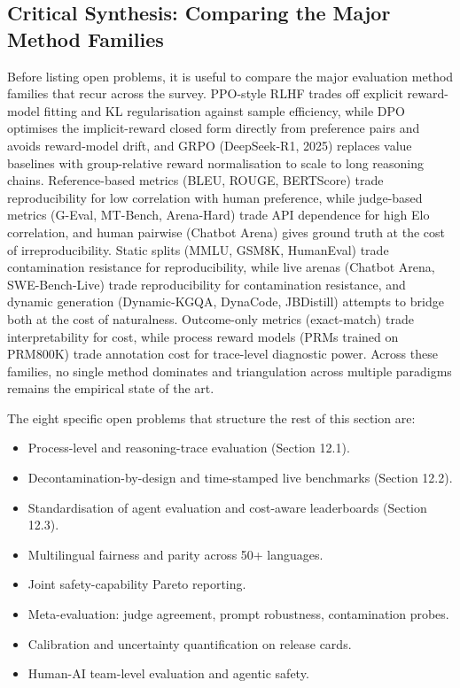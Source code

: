 \documentclass{article}
\begin{document}
\subsection{Critical Synthesis: Comparing the Major Method Families}\label{critical-synthesis-comparing-the-major-method-families}

Before listing open problems, it is useful to compare the major evaluation method families that recur across the survey. PPO-style RLHF \cite{ouyang20222022} trades off explicit reward-model fitting and KL regularisation against sample efficiency, while DPO \cite{rafailov2023directpreferenceop} optimises the implicit-reward closed form directly from preference pairs and avoids reward-model drift, and GRPO (DeepSeek-R1, 2025) replaces value baselines with group-relative reward normalisation to scale to long reasoning chains. Reference-based metrics (BLEU, ROUGE, BERTScore) trade reproducibility for low correlation with human preference, while judge-based metrics (G-Eval, MT-Bench, Arena-Hard) trade API dependence for high Elo correlation, and human pairwise (Chatbot Arena) gives ground truth at the cost of irreproducibility. Static splits (MMLU, GSM8K, HumanEval) trade contamination resistance for reproducibility, while live arenas (Chatbot Arena, SWE-Bench-Live) trade reproducibility for contamination resistance, and dynamic generation (Dynamic-KGQA, DynaCode, JBDistill) attempts to bridge both at the cost of naturalness. Outcome-only metrics (exact-match) trade interpretability for cost, while process reward models (PRMs trained on PRM800K) trade annotation cost for trace-level diagnostic power. Across these families, no single method dominates and triangulation across multiple paradigms remains the empirical state of the art.

The eight specific open problems that structure the rest of this section are:

\begin{itemize}

\item
  Process-level and reasoning-trace evaluation (Section 12.1).
\item
  Decontamination-by-design and time-stamped live benchmarks (Section 12.2).
\item
  Standardisation of agent evaluation and cost-aware leaderboards (Section 12.3).
\item
  Multilingual fairness and parity across 50+ languages.
\item
  Joint safety-capability Pareto reporting.
\item
  Meta-evaluation: judge agreement, prompt robustness, contamination probes.
\item
  Calibration and uncertainty quantification on release cards.
\item
  Human-AI team-level evaluation and agentic safety.
\end{itemize}
\end{document}
